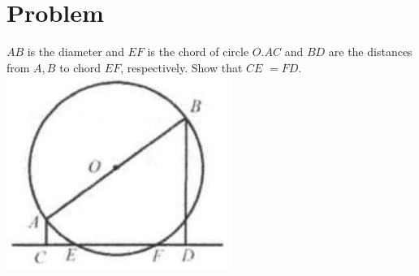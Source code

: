 \documentclass{article}
\begin{document}
\section*{Problem}
\(A B\) is the diameter and \(E F\) is the chord of circle \(O . A C\) and \(B D\) are the distances from \(A, B\) to chord \(E F\), respectively. Show that \(C E\) \(=F D\).\\
\centering
\includegraphics[width=\textwidth]{images/154.jpg}
\end{document}
